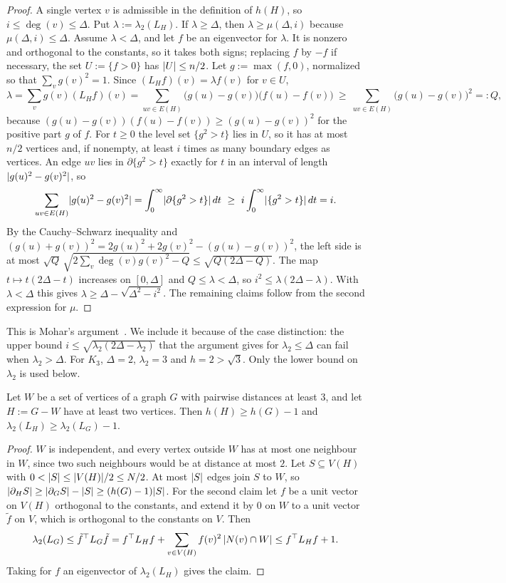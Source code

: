 \begin{proof}
A single vertex $v$ is admissible in the definition of $h(H)$, so $i\le\deg(v)\le\Delta$. Put $\lambda:=\lambda_2(L_H)$. If $\lambda\ge\Delta$, then $\lambda\ge\mu(\Delta,i)$ because $\mu(\Delta,i)\le\Delta$. Assume $\lambda<\Delta$, and let $f$ be an eigenvector for $\lambda$. It is nonzero and orthogonal to the constants, so it takes both signs; replacing $f$ by $-f$ if necessary, the set $U:=\{f>0\}$ has $\lvert U\rvert\le n/2$. Let $g:=\max(f,0)$, normalized so that $\sum_vg(v)^2=1$. Since $(L_Hf)(v)=\lambda f(v)$ for $v\in U$,
\[
  \lambda=\sum_vg(v)(L_Hf)(v)=\sum_{uv\in E(H)}\bigl(g(u)-g(v)\bigr)\bigl(f(u)-f(v)\bigr)\ \ge\ \sum_{uv\in E(H)}\bigl(g(u)-g(v)\bigr)^2=:Q,
\]
because $(g(u)-g(v))(f(u)-f(v))\ge(g(u)-g(v))^2$ for the positive part $g$ of $f$. For $t\ge0$ the level set $\{g^2>t\}$ lies in $U$, so it has at most $n/2$ vertices and, if nonempty, at least $i$ times as many boundary edges as vertices. An edge $uv$ lies in $\partial\{g^2>t\}$ exactly for $t$ in an interval of length $\lvert g(u)^2-g(v)^2\rvert$, so
\[
  \sum_{uv\in E(H)}\abs{g(u)^2-g(v)^2}=\int_0^\infty\abs{\partial\{g^2>t\}}\,dt\ \ge\ i\int_0^\infty\abs{\{g^2>t\}}\,dt=i .
\]
By the Cauchy--Schwarz inequality and $(g(u)+g(v))^2=2g(u)^2+2g(v)^2-(g(u)-g(v))^2$, the left side is at most $\sqrt Q\,\sqrt{2\sum_v\deg(v)g(v)^2-Q}\le\sqrt{Q(2\Delta-Q)}$. The map $t\mapsto t(2\Delta-t)$ increases on $[0,\Delta]$ and $Q\le\lambda<\Delta$, so $i^2\le\lambda(2\Delta-\lambda)$. With $\lambda<\Delta$ this gives $\lambda\ge\Delta-\sqrt{\Delta^2-i^2}$. The remaining claims follow from the second expression for $\mu$.
\end{proof}

This is Mohar's argument~\cite{Mohar89}. We include it because of the case distinction: the upper bound $i\le\sqrt{\lambda_2(2\Delta-\lambda_2)}$ that the argument gives for $\lambda_2\le\Delta$ can fail when $\lambda_2>\Delta$. For $K_3$, $\Delta=2$, $\lambda_2=3$ and $h=2>\sqrt3$. Only the lower bound on $\lambda_2$ is used below.

\begin{lemma}\label{lem:sep3}
Let $W$ be a set of vertices of a graph $G$ with pairwise distances at least $3$, and let $H:=G-W$ have at least two vertices. Then $h(H)\ge h(G)-1$ and $\lambda_2(L_H)\ge\lambda_2(L_G)-1$.
\end{lemma}

\begin{proof}
$W$ is independent, and every vertex outside $W$ has at most one neighbour in $W$, since two such neighbours would be at distance at most $2$. Let $S\subseteq V(H)$ with $0<\lvert S\rvert\le\lvert V(H)\rvert/2\le N/2$. At most $\lvert S\rvert$ edges join $S$ to $W$, so $\lvert \partial_HS\rvert\ge\lvert \partial_GS\rvert-\lvert S\rvert\ge(h(G)-1)\lvert S\rvert$. For the second claim let $f$ be a unit vector on $V(H)$ orthogonal to the constants, and extend it by $0$ on $W$ to a unit vector $\tilde f$ on $V$, which is orthogonal to the constants on $V$. Then
\[
  \lambda_2(L_G)\le\tilde f^{\top}L_G\tilde f=f^{\top}L_Hf+\sum_{v\in V(H)}f(v)^2\,\lvert N(v)\cap W\rvert\le f^{\top}L_Hf+1 .
\]
Taking for $f$ an eigenvector of $\lambda_2(L_H)$ gives the claim.
\end{proof}

